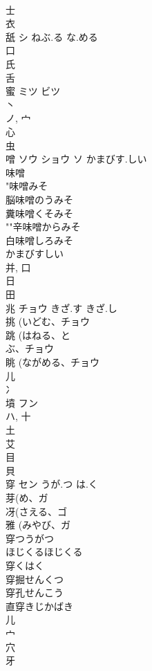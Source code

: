 \documentclass[8pt]{extreport}
\begin{document}
\begin{CJK}{UTF8}{min}
\\	士 
\\	衣 
\\	舐	シ	ねぶ.る な.める	
\\	口 
\\	氏 
\\	舌 
\\	蜜	ミツ ビツ		
\\	丶 
\\	ノ, 宀 
\\	心 
\\	虫 
\\	噌	ソウ ショウ ソ	かまびす.しい	
\\	味噌 
\\	"味噌みそ
\\	脳味噌のうみそ
\\	糞味噌くそみそ
\\	""辛味噌からみそ
\\	白味噌しろみそ
\\	かまびすしい
\\	并, 口 
\\	日 
\\	田 
\\	兆	チョウ	きざ.す きざ.し	
\\	挑 (いどむ、チョウ 
\\	跳 (はねる、と
\\	ぶ、チョウ 
\\	眺 (ながめる、チョウ 
\\	儿 
\\	冫 
\\	墳	フン		
\\	ハ, 十 
\\	土 
\\	艾 
\\	目 
\\	貝 
\\	穿	セン	うが.つ は.く	
\\	芽(め、ガ 
\\	冴(さえる、ゴ 
\\	雅 (みやび、ガ 
\\	穿つうがつ
\\	ほじくるほじくる
\\	穿くはく
\\	穿掘せんくつ
\\	穿孔せんこう
\\	直穿きじかばき
\\	儿 
\\	宀 
\\	穴 
\\	牙 

\end{CJK}
\end{document}
